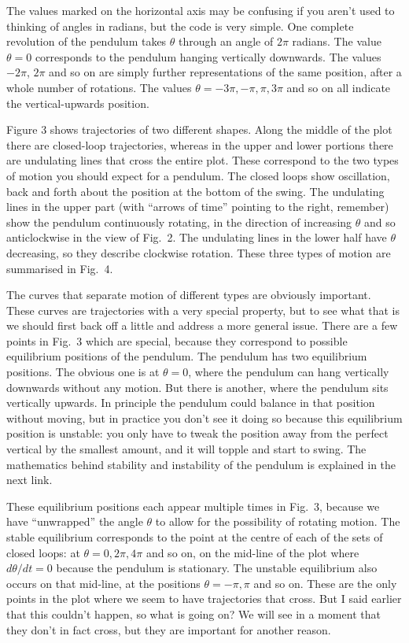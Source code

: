   The values marked on the horizontal axis may be confusing if you aren't used 
  to thinking of angles in radians, but the code is very simple. One complete 
  revolution of the pendulum takes $\theta$ through an angle of $2\pi$ radians. 
  The value $\theta=0$ corresponds to the pendulum hanging vertically 
  downwards. The values $-2\pi$, $2\pi$ and so on are simply further 
  representations of the same position, after a whole number of rotations. The 
  values $\theta = -3\pi,-\pi,\pi,3\pi$ and so on all indicate the 
  vertical-upwards position. 

  Figure 3 shows trajectories of two different shapes. Along the middle of the 
  plot there are closed-loop trajectories, whereas in the upper and lower 
  portions there are undulating lines that cross the entire plot. These 
  correspond to the two types of motion you should expect for a pendulum. The 
  closed loops show oscillation, back and forth about the position at the 
  bottom of the swing. The undulating lines in the upper part (with ``arrows of 
  time'' pointing to the right, remember) show the pendulum continuously 
  rotating, in the direction of increasing $\theta$ and so anticlockwise in the 
  view of Fig.\ 2. The undulating lines in the lower half have $\theta$ 
  decreasing, so they describe clockwise rotation. These three types of motion 
  are summarised in Fig.\ 4. 

  The curves that separate motion of different types are obviously important. 
  These curves are trajectories with a very special property, but to see what 
  that is we should first back off a little and address a more general issue. 
  There are a few points in Fig.\ 3 which are special, because they correspond 
  to possible equilibrium positions of the pendulum. The pendulum has two 
  equilibrium positions. The obvious one is at $\theta=0$, where the pendulum 
  can hang vertically downwards without any motion. But there is another, where 
  the pendulum sits vertically upwards. In principle the pendulum could balance 
  in that position without moving, but in practice you don’t see it doing so 
  because this equilibrium position is unstable: you only have to tweak the 
  position away from the perfect vertical by the smallest amount, and it will 
  topple and start to swing. The mathematics behind stability and instability 
  of the pendulum is explained in the next link. 

  These equilibrium positions each appear multiple times in Fig.\ 3, because we 
  have “unwrapped” the angle $\theta$ to allow for the possibility of rotating 
  motion. The stable equilibrium corresponds to the point at the centre of each 
  of the sets of closed loops: at $\theta=0,2\pi,4\pi$ and so on, on the 
  mid-line of the plot where $d\theta/dt=0$ because the pendulum is stationary. 
  The unstable equilibrium also occurs on that mid-line, at the positions 
  $\theta=-\pi,\pi$ and so on. These are the only points in the plot where we 
  seem to have trajectories that cross. But I said earlier that this couldn’t 
  happen, so what is going on? We will see in a moment that they don’t in fact 
  cross, but they are important for another reason. 

